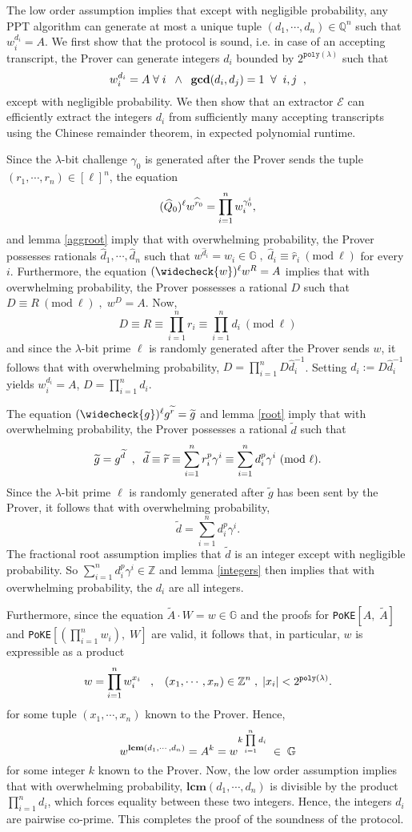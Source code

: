 \documentclass[11pt, lettersize, notitlepage, leqno, footskip=0.6cm]{article}
\newcommand{\bz}{\mathbb Z}
\newcommand{\bq}{\mathbb Q}
\newcommand{\pl}{\prod\limits}
\newcommand{\slim}{\sum\limits}
\newcommand{\ttt}{\texttt}
\newcommand{\bG}{\mathbb{G}}
\newcommand{\wti}{\widetilde}
\newcommand{\mc}{\mathcal}
\newcommand{\mbf}{\mathbf}
\newcommand{\lam}{\lambda}
\newcommand{\what}{\widehat}
\newcommand{\weck}{\widecheck}
\newcommand{\vs}{\vspace{-0.15cm}}
\newcommand{\op}{overwhelming probability}
\newcommand{\np}{negligible probability}
\newcommand{\Mod}[1]{\ (\mathrm{mod}\ #1)}
\newcommand{\LCM}{\mbf{lcm}}
\newcommand{\GCD}{\mbf{gcd}}
\newcommand{\E}{\mc{E}}
\numberwithin{equation}{section}
\begin{document}
\begin{prf} The low order assumption implies that except with \np, any PPT algorithm can generate at most a unique tuple $(d_1,\cdots,d_n)\in \bq^n$ such that $w_i^{d_i} = A$. We first show that the protocol is sound, i.e. in case of an accepting transcript, the Prover can generate integers $d_i$ bounded by $2^{\ttt{poly}(\lam)}$ such that \vs $$w_i^{d_i} = A\;\forall\; i\;\;\wedge\;\;\GCD(d_i,d_j) = 1\;\;\forall\;\; i,j\;\;,\vs $$ except with \np. We then show that an extractor $\E$ can efficiently extract the integers $d_i$ from sufficiently many accepting transcripts using the Chinese remainder theorem, in expected polynomial runtime.

Since the $\lam$-bit challenge $\gamma_{0}$ is generated after the Prover sends the tuple $(r_1,\cdots,r_n)\in[\ell]^n$, the equation \vs $$(\what{Q}_0)^{\ell}w^{\what{r}_0} = \pl_{i=1}^n w_i^{\gamma_{0}^i},\vs $$ and lemma \ref{aggroot} imply that with \op, the Prover possesses rationals $\what{d}_1,\cdots,\what{d}_n$ such that $w^{\what{d}_i} = w_i\in \bG\;,\;\what{d}_i\equiv \what{r}_i\Mod{\ell}$ for every $i$. Furthermore, the equation $(\weck{w})^{\ell}w^R = A$ implies that with \op, the Prover possesses a rational $D$ such that $D\equiv R\Mod{\ell}\;,\;w^{D} =A$. Now, \vs $$D\equiv R\equiv \pl_{i=1}^n r_i \equiv \pl_{i=1}^n d_i\Mod{\ell}$$ and since the $\lam$-bit prime $\ell$ is randomly generated after the Prover sends $w$, it follows that with \op, $D = \prod_{i=1}^n D\what{d}_i^{-1}$. Setting $d_i:= D\what{d}_i^{-1}$ yields $w_i^{d_i} = A$, $ D = \prod_{i=1}^n d_i.$  

The equation $(\weck{g})^{\ell}g^{\wti{r}}=\wti{g}$ and lemma \ref{root} imply that with \op, the Prover possesses a rational $\wti{d}$ such that \vs $$\wti{g} = g^{\wti{d}}\;\;,\;\; \wti{d}\equiv \wti{r}\equiv\slim_{i=1}^n r_i^p\gamma^i\equiv \slim_{i=1}^n d_i^p\gamma^i \Mod{\ell}. \vs $$ Since the $\lam$-bit prime $\ell$ is randomly generated after $\wti{g}$ has been sent by the Prover, it follows that with \op, \vs $$\wti{d} = \slim_{i=1}^n d_i^p\gamma^i.  $$ The fractional root assumption implies that $\wti{d}$ is an integer except with \np. So $\sum_{i=1}^n d_i^p\gamma^i\in \bz$ and lemma \ref{integers} then implies that with \op, the $d_i$ are all integers. 

Furthermore, since the equation $\wti{A}\cdot W = w \in \bG$ and the proofs for \verb|PoKE|$[A,\;\wti{A}]$ and \verb|PoKE|$[(\prod_{i=1}^n w_i),\; W]$ are valid, it follows that, in particular, $w$ is expressible as a product \vs $$w =\pl_{i=1}^n w_i^{x_i}\;\;\;,\;\;\;(x_1,\cdots,x_n)\in\bz^n \;,\;|x_i|< 2^{\ttt{poly}(\lam)}.\vs $$ for some tuple $(x_1,\cdots,x_n)$ known to the Prover. Hence, \vs $$w^{\LCM(d_1,\cdots,d_n)} = A^k = w^{k\pl_{i=1}^n d_i}\;\in\;\bG \vs $$ for some integer $k$ known to the Prover. Now, the low order assumption implies that with \op, $\LCM(d_1,\cdots,d_n)$ is divisible by the product $\prod_{i=1}^n d_i$, which forces equality between these two integers. Hence, the integers $d_i$ are pairwise co-prime. This completes the proof of the soundness of the protocol.


\end{prf}
\end{document}
